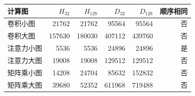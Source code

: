 \begin{tabular}{lrrrrr}\toprule
计算图 & $H_{32}$ & $H_{128}$ & $D_{32}$ & $D_{128}$ & 顺序相同\\\midrule
卷积小图 & 21762 & 21762 & 95564 & 95564 & 否\\
卷积大图 & 157630 & 180030 & 407112 & 439760 & 否\\
注意力小图 & 5536 & 5536 & 24896 & 24896 & 是\\
注意力大图 & 19008 & 19008 & 129512 & 129512 & 否\\
矩阵乘小图 & 14208 & 24704 & 85632 & 152832 & 否\\
矩阵乘大图 & 39680 & 52352 & 611968 & 719488 & 否\\
\bottomrule\end{tabular}
